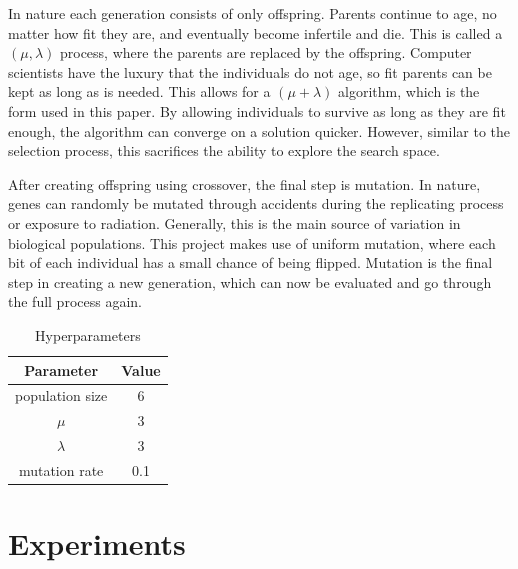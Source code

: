 \documentclass{article}
\begin{document}
In nature each generation consists of only offspring.
Parents continue to age, no matter how fit they are, and eventually become infertile and die.
This is called a $(\mu, \lambda)$ process, where the parents are replaced by the offspring.
Computer scientists have the luxury that the individuals do not age, so fit parents can be kept as long as is needed.
This allows for a $(\mu+\lambda)$ algorithm, which is the form used in this paper.
By allowing individuals to survive as long as they are fit enough, the algorithm can converge on a solution quicker. However, similar to the selection process, this sacrifices the ability to explore the search space. 

After creating offspring using crossover, the final step is mutation.
In nature, genes can randomly be mutated through accidents during the replicating process or exposure to radiation.
Generally, this is the main source of variation in biological populations.
This project makes use of uniform mutation, where each bit of each individual has a small chance of being flipped.
Mutation is the final step in creating a new generation, which can now be evaluated and go through the full process again.

\begin{table}[htbp]
    \centering
    \begin{tabular}
        {|c|c|}
        \toprule
        \textbf{Parameter} & \textbf{Value} \\
        \midrule
        population size & 6 \\
        $\mu$           & 3 \\
        $\lambda$       & 3 \\
        mutation rate   & 0.1 \\
        \bottomrule
    \end{tabular}
    \caption{Hyperparameters}
    \label{tab:hyper}
\end{table}

\section{Experiments}
\label{sec:exp}
\end{document}
